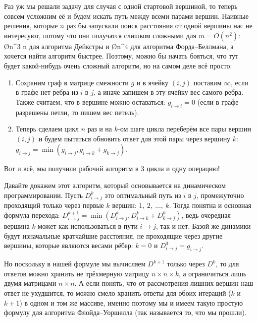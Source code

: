 Раз уж мы решали задачу для случая с одной стартовой вершиной, то теперь совсем усложним её и будем искать путь между всеми парами вершин. Наивные решения, которые $n$ раз бы запускали поиск расстояния от одной вершины нас не интересуют, потому что они получатся слишком сложными для $m = O(n^2)$: \O{n^3 \log n} для алгоритма Дейкстры и \O{n^4} для алгоритма Форда–Беллмана, а хочется найти алгоритм быстрее. Поэтому, можно бы начать бояться, что тут будет какой-нибудь очень сложный алгоритм, но на самом деле всё просто:

\begin{box-algo}
    \begin{enumerate}
        \item Сохраним граф в матрице смежности $g$ и в ячейку $(i, j)$ поставим $\infty$, если в графе нет ребра из $i$ в $j$, а иначе запишем в эту ячейку вес самого ребра. Также считаем, что в вершине можно оставаться: $g_{i \to i} = 0$ (если в графе разрешены петли, то пишем вес петель).
        \item Теперь сделаем цикл $n$ раз и на $k$-ом шаге цикла переберём все пары вершин $(i, j)$ и будем пытаться обновить ответ для этой пары через вершину $k$: $g_{i \to j} = \min(g_{i \to j}, g_{i \to k} + g_{k \to j})$.
    \end{enumerate}
\end{box-algo}

Вот и всё, мы получили рабочий алгоритм в 3 цикла и одну операцию!

Давайте докажем этот алгоритм, который основывается на динамическом программировании. Пусть $D_{i \to j}^k$ это оптимальный путь из $i$ в $j$, промежуточно проходящий только через первые $k$ вершин: $1,\ 2,\ \ldots,\ k$. Тогда понятна и основная формула перехода: $D_{i \to j}^{k + 1} = \min( D_{i \to j}^k, D_{i \to k}^k + D_{k \to j}^{k})$, ведь очередная вершина $k$ может как использоваться в пути $i \to j$, так и нет. Базой же динамики будут изначальные кратчайшие расстояния, не проходящие через другие вершины, которые являются весами рёбер: $k = 0$ и $D_{i \to j}^0 = g_{i \to j}$.

Но поскольку в нашей формуле мы вычисляем $D^{k + 1}$ только через $D^k$, то для ответов можно хранить не трёхмерную матрицу $n \times n \times k$, а ограничиться лишь двумя матрицами $n \times n$. А если понять, что от рассмотрения лишних вершин наш ответ не ухудшится, то можно смело хранить ответы для обоих итераций ($k$ и $k + 1$) в одном и том же массиве, именно поэтому мы и имеем такую простую формулу для алгоритма Флойда–Уоршелла (так называется то, что мы прошли).

